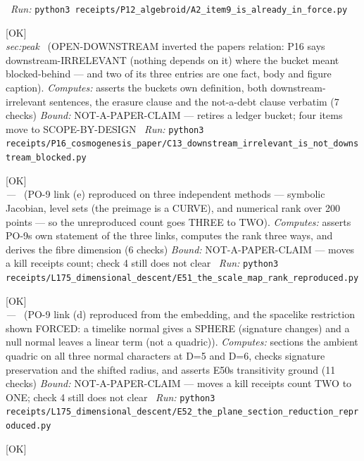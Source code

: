 \begin{description}
\ \emph{Run:} \texttt{python3 receipts/P12\_algebroid/A2\_item9\_is\_already\_in\_force.py}
\item[\label{rcpt:C13_downstream_irrelevant_is_not_downstream_blocked}\texttt{C13\_downstream\_irrelevant\_is\_not\_downstream\_blocked}]\hfill\textsf{[OK]}\\
\textit{sec:peak} \ (OPEN-DOWNSTREAM inverted the papers relation: P16 says downstream-IRRELEVANT (nothing depends on it) where the bucket meant blocked-behind --- and two of its three entries are one fact, body and figure caption). 
\emph{Computes:} asserts the buckets own definition, both downstream-irrelevant sentences, the erasure clause and the not-a-debt clause verbatim (7 checks)
 \emph{Bound:} NOT-A-PAPER-CLAIM --- retires a ledger bucket; four items move to SCOPE-BY-DESIGN
\ \emph{Run:} \texttt{python3 receipts/P16\_cosmogenesis\_paper/C13\_downstream\_irrelevant\_is\_not\_downstream\_blocked.py}
\item[\label{rcpt:E51_the_scale_map_rank_reproduced}\texttt{E51\_the\_scale\_map\_rank\_reproduced}]\hfill\textsf{[OK]}\\
\textit{---} \ (PO-9 link (e) reproduced on three independent methods --- symbolic Jacobian, level sets (the preimage is a CURVE), and numerical rank over 200 points --- so the unreproduced count goes THREE to TWO). 
\emph{Computes:} asserts PO-9s own statement of the three links, computes the rank three ways, and derives the fibre dimension (6 checks)
 \emph{Bound:} NOT-A-PAPER-CLAIM --- moves a kill receipts count; check 4 still does not clear
\ \emph{Run:} \texttt{python3 receipts/L175\_dimensional\_descent/E51\_the\_scale\_map\_rank\_reproduced.py}
\item[\label{rcpt:E52_the_plane_section_reduction_reproduced}\texttt{E52\_the\_plane\_section\_reduction\_reproduced}]\hfill\textsf{[OK]}\\
\textit{---} \ (PO-9 link (d) reproduced from the embedding, and the spacelike restriction shown FORCED: a timelike normal gives a SPHERE (signature changes) and a null normal leaves a linear term (not a quadric)). 
\emph{Computes:} sections the ambient quadric on all three normal characters at D=5 and D=6, checks signature preservation and the shifted radius, and asserts E50s transitivity ground (11 checks)
 \emph{Bound:} NOT-A-PAPER-CLAIM --- moves a kill receipts count TWO to ONE; check 4 still does not clear
\ \emph{Run:} \texttt{python3 receipts/L175\_dimensional\_descent/E52\_the\_plane\_section\_reduction\_reproduced.py}
\item[\label{rcpt:E53_link_c_was_never_L533s}\texttt{E53\_link\_c\_was\_never\_L533s}]\hfill\textsf{[OK]}\\

\end{description}
